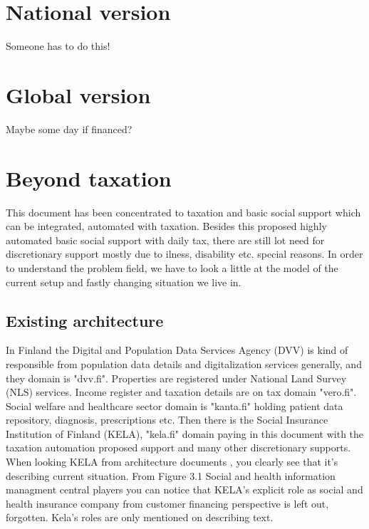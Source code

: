 \section{National version}
\label{implementation_national}
Someone has to do this!

\section{Global version}
\label{implementation_global}
Maybe some day if financed?

\section{Beyond taxation}
\label{beyond_taxation}
This document has been concentrated to taxation and basic social support
which can be integrated, automated with taxation.
Besides this proposed highly automated basic social support with daily tax,
there are still lot need for discretionary support mostly due to ilness,
disability etc. special reasons. In order to understand the problem field,
we have to look a little at the model of the current setup
and fastly changing situation we live in.

\subsection{Existing architecture}
\label{existing_architecture}

In Finland the Digital and Population Data Services Agency (DVV)
is kind of responsible from population data details
and digitalization services generally, and they domain is "dvv.fi".
Properties are registered under National Land Survey (NLS) services.
Income register and taxation details are on tax domain "vero.fi".
Social welfare and healthcare sector domain is "kanta.fi"
holding patient data repository, diagnosis, prescriptions etc.
Then there is the Social Insurance Institution of Finland (KE\-LA),
"kela.fi" domain paying in this document with the taxation automation proposed support
and many other discretionary supports. When looking KE\-LA from architecture documents \cite{SYPLJULK},
you clearly see that it's describing current situation.
From Figure 3.1 Social and health information managment central players \cite{SYPLJULK_Kuva_3.1}
you can notice that KE\-LA's explicit role as social and health insurance company from customer financing perspective is left out, forgotten.
Kela's roles are only mentioned on describing text.

